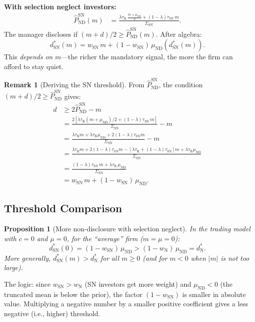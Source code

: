 \documentclass[12pt]{article}
\theoremstyle{plain}
\newtheorem{proposition}{Proposition}
\theoremstyle{definition}
\newtheorem{remark}{Remark}
\newcommand{\ND}{\mathrm{ND}}
\newcommand{\R}{\mathrm{R}}
\newcommand{\SN}{\mathrm{SN}}
\newcommand{\N}{\mathrm{N}}
\begin{document}
\textbf{With selection neglect investors:}
\begin{align*}
\hat{P}_{\ND}^\SN(m) &= \frac{\lambda\tau_\R\,\frac{m+\mu_{\ND}}{2} + (1-\lambda)\tau_\SN\, m}{\Sigma_\SN}.
\end{align*}
The manager discloses if $(m+d)/2 \geq \hat{P}_{\ND}^\SN(m)$. After algebra:
\begin{equation}
\boxed{d^*_\SN(m) = w_\SN\, m + (1 - w_\SN)\,\mu_{\ND}(d^*_\SN(m)).}
\label{eq:trading_threshold_sn}
\end{equation}
This \emph{depends on $m$}---the richer the mandatory signal, the more the firm can afford to stay quiet.

\begin{remark}[Deriving the SN threshold]
\label{rmk:sn_threshold}
From $\hat{P}_{\ND}^\SN$, the condition $(m+d)/2 \geq \hat{P}_{\ND}^\SN$ gives:
\begin{align*}
d &\geq 2\hat{P}_{\ND}^\SN - m \\
&= \frac{2[\lambda\tau_\R(m+\mu_{\ND})/2 + (1-\lambda)\tau_\SN\, m]}{\Sigma_\SN} - m \\
&= \frac{\lambda\tau_\R m + \lambda\tau_\R\mu_{\ND} + 2(1-\lambda)\tau_\SN m}{\Sigma_\SN} - m \\
&= \frac{\lambda\tau_\R m + 2(1-\lambda)\tau_\SN m - [\lambda\tau_\R + (1-\lambda)\tau_\SN]m + \lambda\tau_\R\mu_{\ND}}{\Sigma_\SN} \\
&= \frac{(1-\lambda)\tau_\SN\, m + \lambda\tau_\R\,\mu_{\ND}}{\Sigma_\SN} \\
&= w_\SN\, m + (1-w_\SN)\,\mu_{\ND}.
\end{align*}
\end{remark}

\subsection{Threshold Comparison}

\begin{proposition}[More non-disclosure with selection neglect]
\label{prop:threshold}
In the trading model with $c = 0$ and $\mu = 0$, for the ``average'' firm ($m = \mu = 0$):
\begin{equation}
d^*_\SN(0) = (1-w_\SN)\,\mu_{\ND} > (1-w_\N)\,\mu_{\ND} = d^*_\N.
\end{equation}
More generally, $d^*_\SN(m) > d^*_\N$ for all $m \geq 0$ (and for $m < 0$ when $|m|$ is not too large).
\end{proposition}

The logic: since $w_\SN > w_\N$ (SN investors get more weight) and $\mu_\ND < 0$ (the truncated mean is below the prior), the factor $(1 - w_\SN)$ is smaller in absolute value. Multiplying a negative number by a smaller positive coefficient gives a less negative (i.e., higher) threshold.
\end{document}
